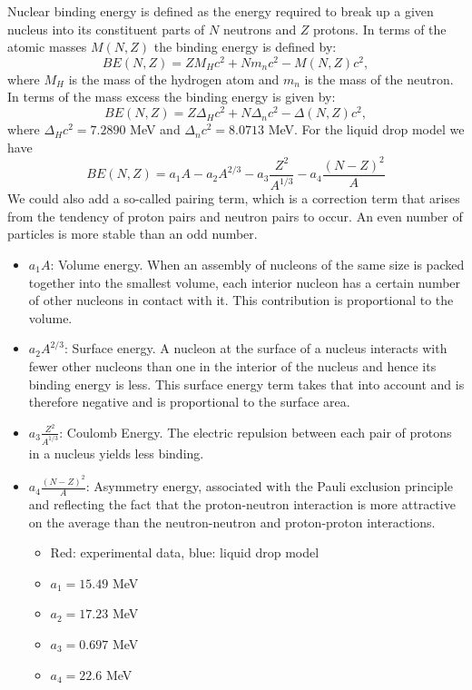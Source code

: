 Nuclear binding energy is defined as the energy required to break up a given nucleus
into its constituent parts of $N$ neutrons and $Z$ protons. In terms of the atomic masses
$M(N, Z)$ the binding energy is defined by:
\[
BE(N, Z) = ZM_H c^2 + Nm_n c^2 - M(N, Z)c^2 ,
\]
where $M_H$ is the mass of the hydrogen atom and $m_n$ is the mass of the neutron.
In terms
of the mass excess the binding energy is given by:
\[
BE(N, Z) = Z\Delta_H c^2 + N\Delta_n c^2 -\Delta(N, Z)c^2 ,
\]
where $\Delta_H c^2 = 7.2890$ MeV and $\Delta_n c^2 = 8.0713$ MeV.
For the liquid drop model we have
\[ BE(N,Z) = a_1A-a_2A^{2/3}-a_3\frac{Z^2}{A^{1/3}}-a_4\frac{(N-Z)^2}{A}\]
We could also add a so-called pairing term, which is a correction term that
arises from the tendency of proton pairs and neutron pairs to
occur. An even number of particles is more stable than an odd number.
\begin{itemize}
\item $a_1A$: Volume energy. When an assembly of nucleons of the same size is packed
together into the smallest volume, each interior nucleon has a certain
number of other nucleons in contact with it. This contribution is proportional to the volume.
\item $a_2A^{2/3}$:   Surface energy. A nucleon at the
surface of a nucleus interacts with fewer other nucleons than one in
the interior of the nucleus and hence its binding energy is less. This
surface energy term takes that into account and is therefore negative
and is proportional to the surface area.
\item $a_3\frac{Z^2}{A^{1/3}}$: Coulomb Energy. The electric
repulsion between each pair of protons in a nucleus yields less binding. 
\item $a_4\frac{(N-Z)^2}{A}$: Asymmetry energy, associated with the Pauli exclusion principle 
and reflecting the fact that the proton-neutron interaction is more attractive on the average than the neutron-neutron and proton-proton interactions.
\begin{itemize}
\item Red: experimental data, blue: liquid drop model
\item $a_1=15.49$ MeV
\item $a_2=17.23$ MeV
\item $a_3=0.697$ MeV
\item $a_4=22.6$ MeV
\end{itemize}






\end{itemize}
